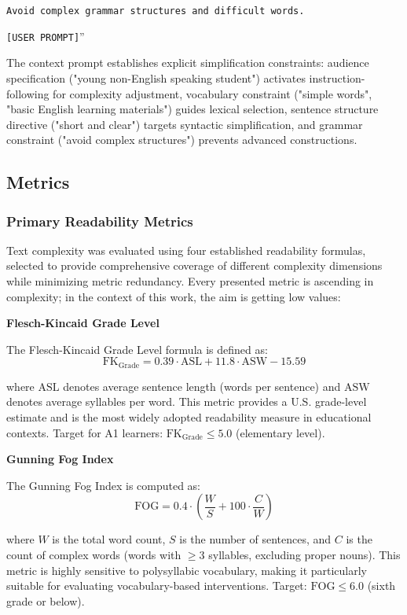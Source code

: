 \documentclass[10pt, a4paper]{article}
\begin{document}
\texttt{Avoid complex grammar structures and difficult words.}

\texttt{[USER PROMPT]}''


The context prompt establishes explicit simplification constraints: audience specification ("young non-English speaking student") activates instruction-following for complexity adjustment, vocabulary constraint ("simple words", "basic English learning materials") guides lexical selection, sentence structure directive ("short and clear") targets syntactic simplification, and grammar constraint ("avoid complex structures") prevents advanced constructions.


\subsection{Metrics}
\subsubsection{Primary Readability Metrics}
Text complexity was evaluated using four established readability formulas, selected to provide comprehensive coverage of different complexity dimensions while minimizing metric redundancy. Every presented metric is ascending in complexity; in the context of this work, the aim is getting low values:

\textbf{Flesch-Kincaid Grade Level}

The Flesch-Kincaid Grade Level formula \cite{kincaid1975derivation} is defined as:
$$
\text{FK}_{\text{Grade}} = 0.39 \cdot \text{ASL} + 11.8 \cdot \text{ASW} - 15.59
$$

where $\text{ASL}$ denotes average sentence length (words per sentence) and $\text{ASW}$ denotes average syllables per word. This metric provides a U.S. grade-level estimate and is the most widely adopted readability measure in educational contexts. Target for A1 learners: $\text{FK}_{\text{Grade}} \leq 5.0$ (elementary level).

\textbf{Gunning Fog Index}

The Gunning Fog Index \cite{gunning1952technique} is computed as:
$$
\text{FOG} = 0.4 \cdot \left(\frac{W}{S} + 100 \cdot \frac{C}{W}\right)
$$

where $W$ is the total word count, $S$ is the number of sentences, and $C$ is the count of complex words (words with $\geq 3$ syllables, excluding proper nouns). This metric is highly sensitive to polysyllabic vocabulary, making it particularly suitable for evaluating vocabulary-based interventions. Target: $\text{FOG} \leq 6.0$ (sixth grade or below).
\end{document}
